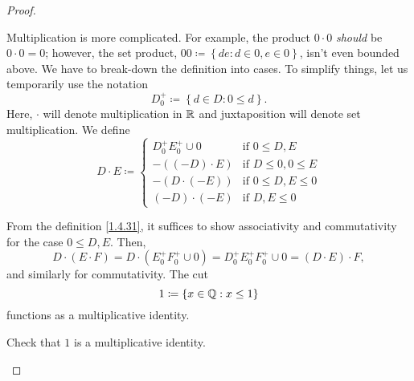 \begin{thm}
\begin{proof}
\begin{savenotes}
Multiplication is more complicated.  For example, the product $0\cdot 0$ \emph{should} be $0\cdot 0=0$; however, the set product, $00\coloneqq \left\{ de:d\in 0,e\in 0\right\}$, isn't even bounded above.  We have to break-down the definition into cases.  To simplify things, let us temporarily use the notation
\begin{equation}
D_0^+\coloneqq \left\{ d\in D:0\leq d\right\} .
\end{equation}
Here, $\cdot$ will denote multiplication in $\mathbb{R}$ and juxtaposition will denote set multiplication.  We define
\begin{equation}\label{1.4.31}
D\cdot E\coloneqq \begin{cases}D_0^+E_0^+\cup 0 & \text{if }0\leq D,E  \\ -\left( (-D)\cdot E\right) & \text{if }D\leq 0,0\leq E \\ -\left( D\cdot (-E)\right) & \text{if }0\leq D,E\leq 0 \\ (-D)\cdot (-E) & \text{if }D,E\leq 0\end{cases}
\end{equation}

From the definition \eqref{1.4.31}, it suffices to show associativity and commutativity for the case $0\leq D,E$.  Then,
\begin{equation}
D\cdot (E\cdot F)=D\cdot \left( E_0^+F_0^+\cup 0\right) =D_0^+E_0^+F_0^+\cup 0=(D\cdot E)\cdot F,
\end{equation}
and similarly for commutativity.  The cut
\begin{equation}
1\coloneqq \left\{ x\in \mathbb{Q} :x\leq 1\right\}
\end{equation}
functions as a multiplicative identity.
\begin{exr}
Check that $1$ is a multiplicative identity.
\end{exr}


\end{savenotes}
\end{proof}
\end{thm}
